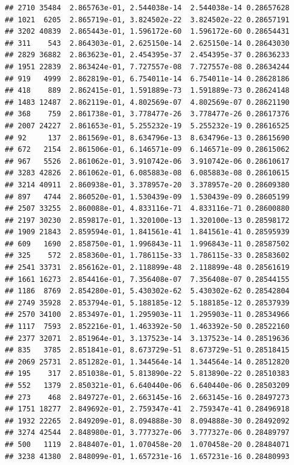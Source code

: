 \documentclass[
]{article}
\begin{document}
\begin{verbatim}
## 2710 35484  2.865763e-01, 2.544038e-14  2.544038e-14 0.28657628
## 1021  6205  2.865719e-01, 3.824502e-22  3.824502e-22 0.28657191
## 3202 40839  2.865443e-01, 1.596172e-60  1.596172e-60 0.28654431
## 311    543  2.864303e-01, 2.625150e-14  2.625150e-14 0.28643030
## 2829 36882  2.863623e-01, 2.454395e-37  2.454395e-37 0.28636233
## 1951 22839  2.863424e-01, 7.727557e-08  7.727557e-08 0.28634244
## 919   4999  2.862819e-01, 6.754011e-14  6.754011e-14 0.28628186
## 418    889  2.862415e-01, 1.591889e-73  1.591889e-73 0.28624148
## 1483 12487  2.862119e-01, 4.802569e-07  4.802569e-07 0.28621190
## 368    759  2.861738e-01, 3.778477e-26  3.778477e-26 0.28617376
## 2007 24227  2.861653e-01, 5.255232e-19  5.255232e-19 0.28616525
## 92     137  2.861569e-01, 8.634796e-13  8.634796e-13 0.28615690
## 672   2154  2.861506e-01, 6.146571e-09  6.146571e-09 0.28615062
## 967   5526  2.861062e-01, 3.910742e-06  3.910742e-06 0.28610617
## 3283 42826  2.861062e-01, 6.085883e-08  6.085883e-08 0.28610615
## 3214 40911  2.860938e-01, 3.378957e-20  3.378957e-20 0.28609380
## 897   4744  2.860520e-01, 1.530439e-09  1.530439e-09 0.28605199
## 2507 33255  2.860088e-01, 4.833116e-71  4.833116e-71 0.28600880
## 2197 30230  2.859817e-01, 1.320100e-13  1.320100e-13 0.28598172
## 1909 21843  2.859594e-01, 1.841561e-41  1.841561e-41 0.28595939
## 609   1690  2.858750e-01, 1.996843e-11  1.996843e-11 0.28587502
## 325    572  2.858360e-01, 1.786115e-33  1.786115e-33 0.28583602
## 2541 33731  2.856162e-01, 2.118899e-48  2.118899e-48 0.28561619
## 1661 16273  2.854416e-01, 7.356408e-07  7.356408e-07 0.28544155
## 1186  8769  2.854280e-01, 5.430302e-62  5.430302e-62 0.28542804
## 2749 35928  2.853794e-01, 5.188185e-12  5.188185e-12 0.28537939
## 2570 34100  2.853497e-01, 1.295903e-11  1.295903e-11 0.28534966
## 1117  7593  2.852216e-01, 1.463392e-50  1.463392e-50 0.28522160
## 2377 32071  2.851964e-01, 3.137523e-14  3.137523e-14 0.28519636
## 835   3785  2.851841e-01, 8.673729e-51  8.673729e-51 0.28518415
## 2069 25731  2.851282e-01, 1.344564e-14  1.344564e-14 0.28512820
## 195    317  2.851038e-01, 5.813890e-22  5.813890e-22 0.28510383
## 552   1379  2.850321e-01, 6.640440e-06  6.640440e-06 0.28503209
## 273    468  2.849727e-01, 2.663145e-16  2.663145e-16 0.28497273
## 1751 18277  2.849692e-01, 2.759347e-41  2.759347e-41 0.28496918
## 1932 22265  2.849209e-01, 8.094888e-30  8.094888e-30 0.28492092
## 3274 42544  2.848980e-01, 3.777327e-06  3.777327e-06 0.28489797
## 500   1119  2.848407e-01, 1.070458e-20  1.070458e-20 0.28484071
## 3238 41380  2.848099e-01, 1.657231e-16  1.657231e-16 0.28480993

\end{verbatim}
\end{document}
